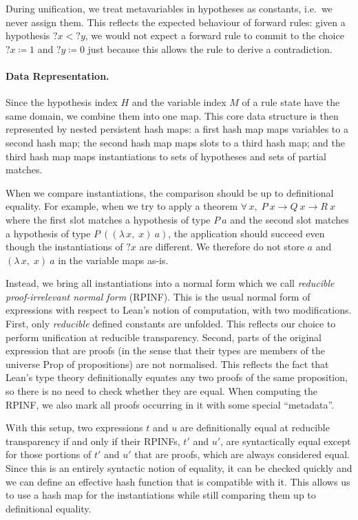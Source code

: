 \documentclass[runningheads]{llncs}
\newcommand{\Lam}[2]{\ensuremath{\lambda\, #1,\; #2}}
\newcommand{\All}[2]{\ensuremath{\forall\, #1,\; #2}}
\newcommand{\mvar}[1]{\ensuremath{?#1}}
\newcommand{\Prop}{\ensuremath{\mathrm{Prop}}}
\begin{document}
During unification, we treat metavariables in hypotheses as constants, i.e.\ we never assign them.
This reflects the expected behaviour of forward rules: given a hypothesis $\mvar{x} < \mvar{y}$, we would not expect a forward rule to commit to the choice $\mvar{x} ≔ 1$ and $\mvar{y} ≔ 0$ just because this allows the rule to derive a contradiction.

\paragraph{Data Representation.}
Since the hypothesis index $H$ and the variable index $M$ of a rule state have the same domain, we combine them into one map.
This core data structure is then represented by nested persistent hash maps: a first hash map maps variables to a second hash map; the second hash map maps slots to a third hash map; and the third hash map maps instantiations to sets of hypotheses and sets of partial matches.

When we compare instantiations, the comparison should be up to definitional equality.
For example, when we try to apply a theorem $\All{x}{P~x → Q~x → R~x}$ where the first slot matches a hypothesis of type $P~a$ and the second slot matches a hypothesis of type $P~((\Lam{x}{x})~a)$, the application should succeed even though the instantiations of $\mvar{x}$ are different.
We therefore do not store $a$ and $(\Lam{x}{x})~a$ in the variable maps as-is.

Instead, we bring all instantiations into a normal form which we call \emph{reducible proof-irrelevant normal form} (RPINF).
This is the usual normal form of expressions with respect to Lean's notion of computation, with two modifications.
First, only \emph{reducible} defined constants are unfolded.
This reflects our choice to perform unification at reducible transparency.
Second, parts of the original expression that are proofs (in the sense that their types are members of the universe $\Prop$ of propositions) are not normalised.
This reflects the fact that Lean's type theory definitionally equates any two proofs of the same proposition, so there is no need to check whether they are equal.
When computing the RPINF, we also mark all proofs occurring in it with some special \enquote{metadata}.

With this setup, two expressions $t$ and $u$ are definitionally equal at reducible transparency if and only if their RPINFs, $t'$ and $u'$, are syntactically equal except for those portions of $t'$ and $u'$ that are proofs, which are always considered equal.
Since this is an entirely syntactic notion of equality, it can be checked quickly and we can define an effective hash function that is compatible with it.
This allows us to use a hash map for the instantiations while still comparing them up to definitional equality.
\end{document}
